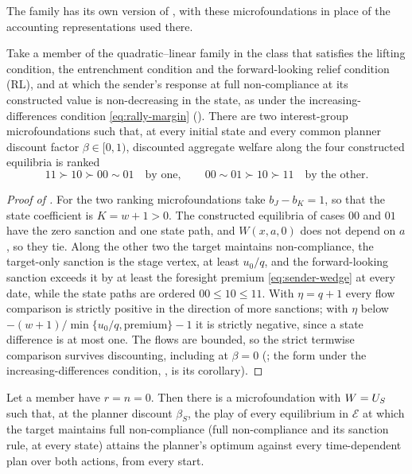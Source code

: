 The family has its own version of , with
these microfoundations in place of the accounting representations used there.

\begin{proposition}
\label{prop:family-welfare-nonidentification}
Take a member of the quadratic--linear family in the class that satisfies
the lifting condition, the entrenchment condition and the forward-looking relief condition
\textup{(RL)}, and at which the sender's response at full non-compliance at its
constructed value is non-decreasing in the state, as under the increasing-differences condition \eqref{eq:rally-margin} ().
There are two interest-group microfoundations such that, at every initial state
and every common planner discount factor $\beta\in[0,1)$, discounted aggregate
welfare along the four constructed equilibria is ranked
\[
11\succ10\succ00\sim01\quad\text{by one},\qquad
00\sim01\succ10\succ11\quad\text{by the other}.
\]
\end{proposition}

\begin{proof}[Proof of ]
For the two ranking microfoundations take $b_J-b_K=1$, so that the state
coefficient is $K=w+1>0$. The constructed equilibria of cases $00$ and $01$ have
the zero sanction and one state path, and $W(x,a,0)$ does not depend on $a$,
so they tie. Along the other two the target maintains non-compliance, the target-only
sanction is the stage vertex, at least $u_0/q$, and the forward-looking
sanction exceeds it by at least the foresight premium \eqref{eq:sender-wedge} at every
date, while the state paths are ordered $00\le10\le11$. With $\eta=q+1$ every
flow comparison is strictly positive in the direction of more sanctions; with
$\eta$ below $-(w+1)/\min\{u_0/q,\text{premium}\}-1$ it is strictly negative,
since a state difference is at most one. The flows are bounded, so the strict
termwise comparison survives discounting, including at $\beta=0$
(; the
form under the increasing-differences condition, , is its
corollary).
\end{proof}

\begin{corollary}
\label{cor:planner-efficient-boundary}
Let a member have $r=n=0$. Then there is a microfoundation with $W=U_S$ such that,
at the planner discount $\beta_S$, the play of every equilibrium in $\mathcal E$
at which the target maintains full non-compliance (full non-compliance and its sanction rule,
at every state) attains the planner's optimum against every
time-dependent plan over both actions, from every start.
\end{corollary}

